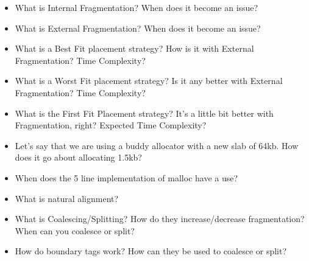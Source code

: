 \begin{itemize}
\tightlist
\item
  What is Internal Fragmentation? When does it become an issue?
\item
  What is External Fragmentation? When does it become an issue?
\item
  What is a Best Fit placement strategy? How is it with External Fragmentation? Time Complexity?
\item
  What is a Worst Fit placement strategy? Is it any better with External Fragmentation? Time Complexity?
\item
  What is the First Fit Placement strategy? It's a little bit better with Fragmentation, right? Expected Time Complexity?
\item
  Let's say that we are using a buddy allocator with a new slab of 64kb. How does it go about allocating 1.5kb?
\item
  When does the 5 line  implementation of malloc have a use?
\item
  What is natural alignment?
\item
  What is Coalescing/Splitting? How do they increase/decrease fragmentation? When can you coalesce or split?
\item
  How do boundary tags work? How can they be used to coalesce or split?
\end{itemize}


